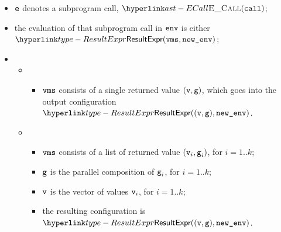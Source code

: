 \ProseParagraph
\AllApply
\begin{itemize}
  \item $\ve$ denotes a subprogram call, $\ECall(\vcall)$;
  \item the evaluation of that subprogram call in $\env$ is either\\
  $\ResultExpr(\vms, \newenv)$\ProseOrAbnormal;
  \item \OneApplies
  \begin{itemize}
    \item {}
    \begin{itemize}
      \item $\vms$ consists of a single returned value $(\vv,\vg)$,
      which goes into the output configuration $\ResultExpr((\vv, \vg), \newenv)$.
    \end{itemize}

    \item {}
    \begin{itemize}
      \item $\vms$ consists of a list of returned value $(\vv_i,\vg_i)$, for $i=1..k$;
      \item $\vg$ is the parallel composition of $\vg_i$, for $i=1..k$;
      \item $\vv$ is the \nativevalueterm{}  vector of values $\vv_i$, for $i=1..k$;
      \item the resulting configuration is $\ResultExpr((\vv, \vg), \newenv)$.
    \end{itemize}
  \end{itemize}
\end{itemize}

\FormallyParagraph
\begin{mathpar}
\end{mathpar}

\begin{mathpar}
\end{mathpar}

